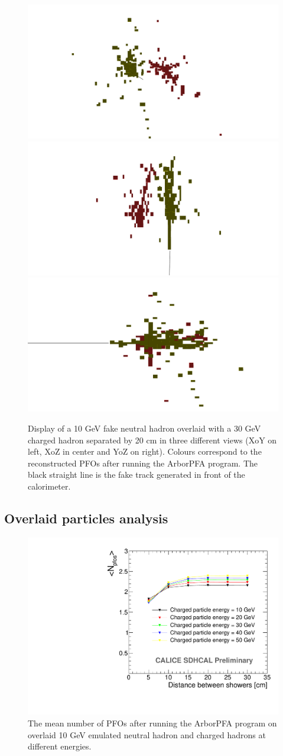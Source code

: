 \documentclass[12pt]{article}
\begin{document}
\begin{figure}[!h]
  \begin{center}
    \includegraphics[width=0.32\linewidth]{ArborPFA_PandoraMonitoring_SDHCAL_Overlay_XY.pdf}
    \includegraphics[width=0.32\linewidth]{ArborPFA_PandoraMonitoring_SDHCAL_Overlay_XZ.pdf}
    \includegraphics[width=0.32\linewidth]{ArborPFA_PandoraMonitoring_SDHCAL_Overlay_YZ.pdf}
  \end{center}
  \caption{\label{OVERLAY_EVENT_DISPLAY} Display of a 10 GeV fake neutral hadron overlaid with a 30 GeV charged hadron separated by 20 cm in three different views (XoY on left, XoZ in center and YoZ on right). Colours correspond to the reconstructed PFOs after running the ArborPFA program. The black straight line is the fake track generated in front of the calorimeter.}
\end{figure}

\subsection{Overlaid particles analysis}

\begin{figure}[!h]
  \begin{center}
    \includegraphics[width=0.6\linewidth]{plots/OverlayEvent_NPfos.pdf}
  \end{center}
  \caption{\label{OVERLAY_EVENT_NPFOS} The mean number of PFOs after running the ArborPFA program on overlaid 10 GeV emulated neutral hadron and charged hadrons at different energies.}
\end{figure}
\end{document}
